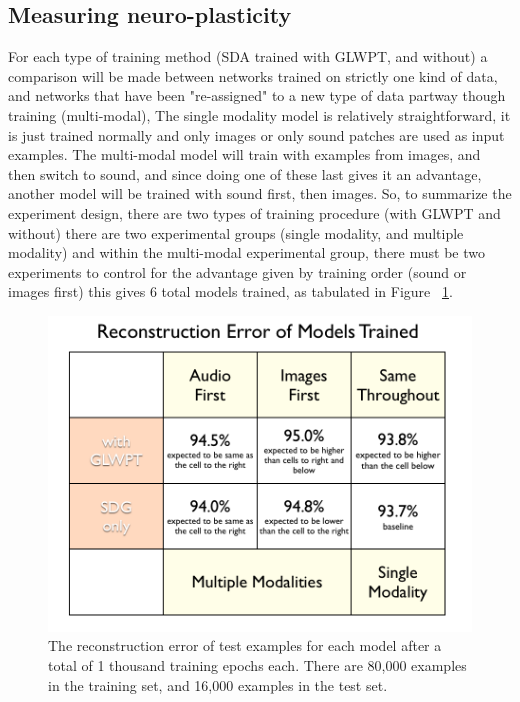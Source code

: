 \documentclass[12pt]{article}
\begin{document}
\begin{doublespacing}
	\subsection{Measuring neuro-plasticity}
	For each type of training method (SDA trained with GLWPT, and without)  a comparison will be made between networks trained on strictly one kind of data, and networks that have been "re-assigned" to a new type of data partway though training (multi-modal), The single modality model is relatively  straightforward, it is just trained normally and only images or only sound patches are used as input examples. The multi-modal model will train with examples from images, and then switch to sound, and since doing one of these last gives it an advantage, another model will be trained with sound first, then images. So, to summarize the experiment design, there are two types of training procedure (with GLWPT and without) there are two experimental groups (single modality, and multiple modality) and within the multi-modal experimental group, there must be two experiments to control for the advantage given by training order (sound or images first) this gives 6 total models trained, as tabulated in Figure ~\ref{fig:table_of_models}.
	
\begin{figure}[p]
\centering
\includegraphics[width=6in]{table_of_models}
\caption{The reconstruction error of test examples for each  model after a total of 1 thousand training epochs each. There are 80,000 examples in the training set, and 16,000 examples in the test set.}
\label{fig:table_of_models}
\end{figure}
	

\end{doublespacing}
\end{document}
